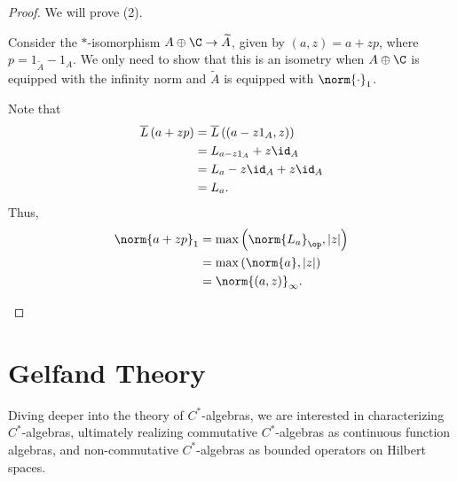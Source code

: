\documentclass[10pt]{mypackage}
\begin{document}
\begin{proof}
  We will prove (2).
  \begin{description}[font=\normalfont]
    \item[(2)] Consider the $\ast$-isomorphism $A\oplus \C \rightarrow \widetilde{A}$, given by $\left(a,z\right) = a + zp$, where $p = 1_{\widetilde{A}} - 1_{A}$. We only need to show that this is an isometry when $A\oplus \C$ is equipped with the infinity norm and $\widetilde{A}$ is equipped with $\norm{\cdot}_1$.\newline

      Note that
      \begin{align*}
        \overline{L}\left(a + zp\right) &= \overline{L}\left(\left(a-z1_{A},z\right)\right)\\
                                        &= L_{a-z1_A} + z\id_A\\
                                        &= L_a - z\id_A + z\id_A\\
                                        &= L_a.
      \end{align*}
      Thus,
      \begin{align*}
        \norm{a+zp}_1 &= \max\left(\norm{L_a}_{\op},\left\vert z \right\vert\right)\\
                      &= \max\left(\norm{a},\left\vert z \right\vert\right)\\
                      &= \norm{\left(a,z\right)}_{\infty}.
      \end{align*}
  \end{description}
\end{proof}
\section{Gelfand Theory}%
Diving deeper into the theory of $C^{\ast}$-algebras, we are interested in characterizing $C^{\ast}$-algebras, ultimately realizing commutative $C^{\ast}$-algebras as continuous function algebras, and non-commutative $C^{\ast}$-algebras as bounded operators on Hilbert spaces.
\end{document}
